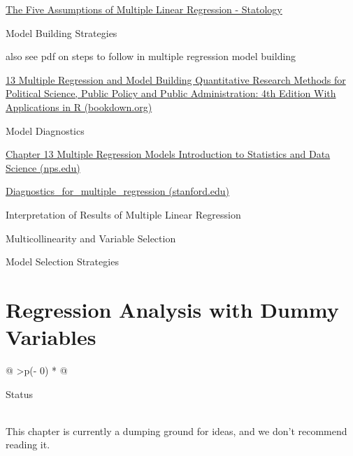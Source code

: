 \documentclass[
  letterpaper,
  paper =a4,
  twoside,
  openright,
  headsepline,
  footsepline,
  listof = totocnumbered,
  chapterprefix = true,
  firstiscover]{scrbook}
\begin{document}
\href{https://www.statology.org/multiple-linear-regression-assumptions/}{The
Five Assumptions of Multiple Linear Regression - Statology}

Model Building Strategies

also see pdf on steps to follow in multiple regression model building

\href{https://bookdown.org/ripberjt/qrmbook/multiple-regression-and-model-building.html}{13
Multiple Regression and Model Building \textbar{} Quantitative Research
Methods for Political Science, Public Policy and Public Administration:
4th Edition With Applications in R (bookdown.org)}

Model Diagnostics

\href{https://faculty.nps.edu/rbassett/_book/multiple-regression-models.html}{Chapter
13 Multiple Regression Models \textbar{} Introduction to Statistics and
Data Science (nps.edu)}

\href{https://web.stanford.edu/class/stats191/notebooks/Diagnostics_for_multiple_regression.html}{Diagnostics\_for\_multiple\_regression
(stanford.edu)}

Interpretation of Results of Multiple Linear Regression

Multicollinearity and Variable Selection

Model Selection Strategies


\hypertarget{regression-analysis-with-dummy-variables}{%
\chapter{Regression Analysis with Dummy
Variables}\label{regression-analysis-with-dummy-variables}}

\begin{longtable}[]{@{}
  >{\centering\arraybackslash}p{(\columnwidth - 0\tabcolsep) * }@{}}
\toprule\noalign{}
\begin{minipage}[b]{\linewidth}\centering
Status
\end{minipage} \\
\midrule\noalign{}
\endhead
\bottomrule\noalign{}
\endlastfoot
This chapter is currently a dumping ground for ideas, and we don't
recommend reading it. \\
\end{longtable}
\end{document}
